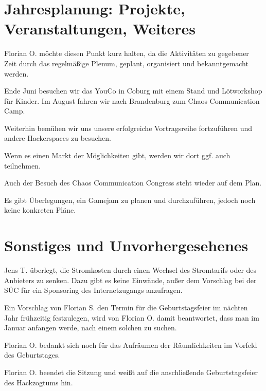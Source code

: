\section{Jahresplanung: Projekte, Veranstaltungen, Weiteres}
Florian O. möchte diesen Punkt kurz halten, da die Aktivitäten zu gegebener Zeit durch das regelmäßige Plenum, geplant, organisiert und bekanntgemacht werden. 

Ende Juni besuchen wir das YouCo in Coburg mit einem Stand und Lötworkshop für Kinder.
Im August fahren wir nach Brandenburg zum Chaos Communication Camp.

Weiterhin bemühen wir uns unsere erfolgreiche Vortragsreihe fortzuführen und andere Hackerspaces zu besuchen.

Wenn es einen Markt der Möglichkeiten gibt, werden wir dort ggf. auch teilnehmen.

Auch der Besuch des Chaos Communication Congress steht wieder auf dem Plan.

Es gibt Überlegungen, ein Gamejam zu planen und durchzuführen, jedoch noch keine konkreten Pläne.

 
\section{Sonstiges und Unvorhergesehenes}
Jens T. überlegt, die Stromkosten durch einen Wechsel des Stromtarifs oder des Anbieters zu senken.
Dazu gibt es keine Einwände, außer dem Vorschlag bei der SÜC für ein Sponsoring des Internetzugangs anzufragen.

Ein Vorschlag von Florian S. den Termin für die Geburtstagsfeier im nächten Jahr frühzeitig festzulegen, wird von Florian O. damit beantwortet, dass man im Januar anfangen werde, nach einem solchen zu suchen.

Florian O. bedankt sich noch für das Aufräumen der Räumlichkeiten im Vorfeld des Geburtstages.

Florian O. beendet die Sitzung und weißt auf die anschließende Geburtstagsfeier des Hackzogtums hin. 
